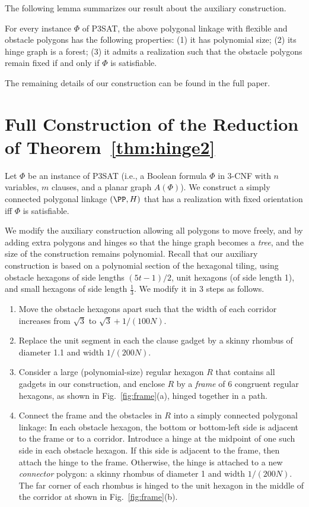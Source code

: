 The following lemma summarizes our result about the auxiliary construction.
\begin{lem}\label{lem:aux}
For every instance $\Phi$ of P3SAT, the above polygonal linkage with flexible and obstacle polygons
has the following properties: (1) it has polynomial size; (2) its hinge graph is a forest;
(3) it admits a realization such that the obstacle polygons remain fixed if and only if $\Phi$ is satisfiable.
\end{lem}
The remaining details of our construction can be found in the full paper.
\section{Full Construction of the Reduction of Theorem~\ref{thm:hinge2}}
\label{app:full}
Let $\Phi$ be an instance of P3SAT (i.e., a Boolean formula $\Phi$
in 3-CNF with $n$ variables, $m$ clauses, and a planar graph $A(\Phi)$).
We construct a simply connected polygonal linkage $(\PP,H)$ that has a
realization with fixed orientation iff $\Phi$ is satisfiable.

We modify the auxiliary construction allowing all polygons to move freely, and by adding extra polygons and hinges so that the hinge graph becomes a \emph{tree}, and the size of the construction remains polynomial. Recall that our auxiliary construction is based on a polynomial section of the hexagonal tiling, using obstacle hexagons of side lengths $(5t-1)/2$, unit hexagons (of side length 1), and small hexagons of side length $\frac{1}{3}$. We modify it in 3 steps as follows.

\begin{enumerate}
\item Move the obstacle hexagons apart such that the width of each corridor increases from $\sqrt{3}$ to $\sqrt{3}+1/(100N)$.
\item Replace the unit segment in each the clause gadget by a skinny rhombus of diameter 1.1 and width $1/(200N)$.
\item Consider a large (polynomial-size) regular hexagon $R$ that contains all gadgets in our construction, and enclose $R$ by a \emph{frame} of 6 congruent regular hexagons, as shown in Fig.~\ref{fig:frame}(a), hinged together in a path.
\item Connect the frame and the obstacles in $R$ into a simply connected polygonal linkage: In each obstacle hexagon, the bottom or bottom-left side is adjacent to the frame or to a corridor. Introduce a hinge at the midpoint of one such side in each obstacle hexagon. If this side is adjacent to the frame, then attach the hinge to the frame. Otherwise, the hinge is attached to a new \emph{connector} polygon: a skinny rhombus of diameter 1 and width $1/(200N)$. The far corner of each rhombus is hinged to the unit hexagon in the middle of the corridor at shown in Fig.~\ref{fig:frame}(b).
\end{enumerate}

